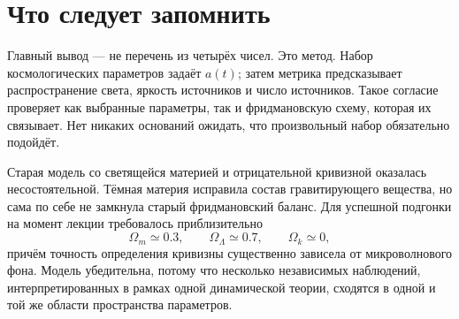 \section{Что следует запомнить}

Главный вывод — не перечень из четырёх чисел. Это метод. Набор космологических параметров задаёт \(a(t)\); затем метрика предсказывает распространение света, яркость источников и число источников. Такое согласие проверяет как выбранные параметры, так и фридмановскую схему, которая их связывает. Нет никаких оснований ожидать, что произвольный набор обязательно подойдёт.

Старая модель со светящейся материей и отрицательной кривизной оказалась несостоятельной. Тёмная материя исправила состав гравитирующего вещества, но сама по себе не замкнула старый фридмановский баланс. Для успешной подгонки на момент лекции требовалось приблизительно
\begin{equation}
\Omega_m\simeq0.3,
\qquad
\Omega_\Lambda\simeq0.7,
\qquad
\Omega_k\simeq0,
\end{equation}
причём точность определения кривизны существенно зависела от микроволнового фона. Модель убедительна, потому что несколько независимых наблюдений, интерпретированных в рамках одной динамической теории, сходятся в одной и той же области пространства параметров.
